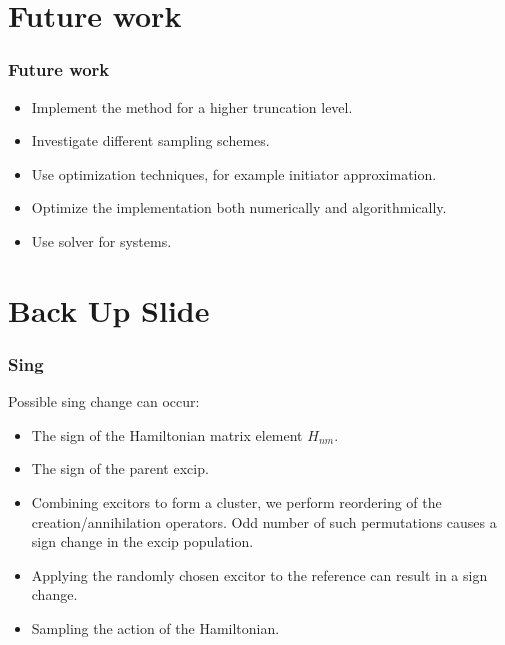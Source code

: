 \documentclass{beamer}
\begin{document}
\section{Future work}
\begin{frame}
\frametitle{Future work}
\begin{itemize}
\item Implement the method for a higher truncation level.
\item Investigate different sampling schemes.
\item Use optimization techniques, for example initiator approximation.
\item Optimize the implementation both numerically and algorithmically.
\item Use solver for systems.
\end{itemize}
\end{frame}


\section{Back Up Slide}
\begin{frame}
\frametitle{Sing}
Possible sing change can occur:
\begin{itemize}
	
\item The sign of the Hamiltonian matrix element $H_{nm}$.

\item The sign of the parent excip. 

\item Combining excitors to form a cluster, we perform reordering of the creation/annihilation operators. Odd number of such permutations causes a sign change in the excip population.

\item Applying the randomly chosen excitor to the reference can result in a sign change.

\item Sampling the action of the Hamiltonian.
\end{itemize}
\end{frame}
\end{document}

